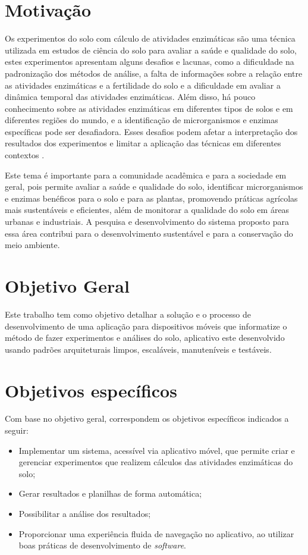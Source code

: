 \section[Motivação]{Motivação}
Os experimentos do solo com cálculo de atividades enzimáticas são uma técnica utilizada em estudos de ciência do solo para avaliar a saúde e qualidade do solo, estes experimentos apresentam alguns desafios e lacunas, como a dificuldade na padronização dos métodos de análise, a falta de informações sobre a relação entre as atividades enzimáticas e a fertilidade do solo e a dificuldade em avaliar a dinâmica temporal das atividades enzimáticas. Além disso, há pouco conhecimento sobre as atividades enzimáticas em diferentes tipos de solos e em diferentes regiões do mundo, e a identificação de microrganismos e enzimas específicas pode ser desafiadora. Esses desafios podem afetar a interpretação dos resultados dos experimentos e limitar a aplicação das técnicas em diferentes contextos \cite{tabatabai1994soil}.

Este tema é importante para a comunidade acadêmica e para a sociedade em geral, pois permite avaliar a saúde e qualidade do solo, identificar microrganismos e enzimas benéficos para o solo e para as plantas, promovendo práticas agrícolas mais sustentáveis e eficientes, além de monitorar a qualidade do solo em áreas urbanas e industriais. A pesquisa e desenvolvimento do sistema proposto para essa área contribui para o desenvolvimento sustentável e para a conservação do meio ambiente.
 
\section{Objetivo Geral}\label{sec:objetivo_geral}

Este trabalho tem como objetivo detalhar a solução e o processo de desenvolvimento de uma aplicação para dispositivos móveis que informatize o método de fazer experimentos e análises do solo, aplicativo este desenvolvido usando padrões arquiteturais limpos, escaláveis, manuteníveis e testáveis.

\section{Objetivos específicos}\label{sec:objetivo_específico}
Com base no objetivo geral, correspondem os objetivos específicos indicados a seguir:

\begin{itemize}
    \item Implementar um sistema, acessível via aplicativo móvel, que permite criar e gerenciar experimentos que realizem cálculos das atividades enzimáticas do solo;
    \item Gerar resultados e planilhas de forma automática;
    \item Possibilitar a análise dos resultados;
    \item Proporcionar uma experiência fluida de navegação no aplicativo, ao utilizar boas práticas de desenvolvimento de \textit{software}.
\end{itemize}

